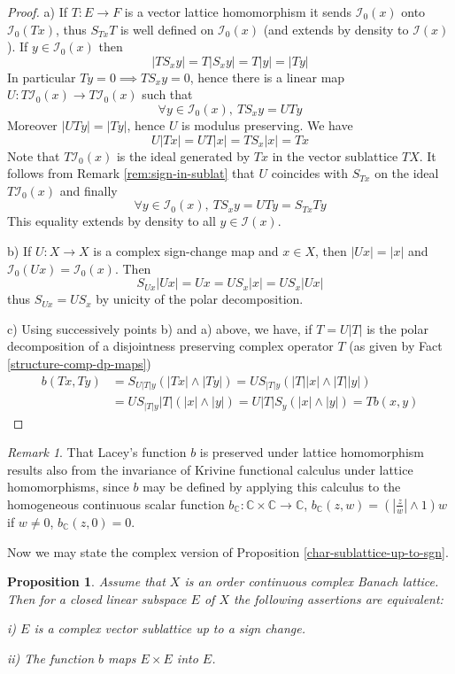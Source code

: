 \documentclass[11pt]{amsart}
\theoremstyle{plain}
\newtheorem{proposition}[theorem]{Proposition}
\theoremstyle{remark}
\newtheorem{remark}[theorem]{Remark}
\newcommand{\comp}{\mathbb C}
\newcommand{\I}{\mathcal I}
\begin{document}
\begin{proof}

a)  If $T:E\to F$ is a vector lattice homomorphism it sends $\mathcal I_0(x)$ onto $\mathcal I_0(Tx)$, thus  $S_{Tx}T$ is well defined on $\mathcal I_0(x)$ (and extends by density to $\I(x)$). If $y\in \mathcal I_0(x)$ then
\[ |TS_xy|= T|S_xy|= T|y|= |Ty|\]
In particular $Ty=0\implies TS_xy=0$, hence there is a linear map $U: T\mathcal I_0(x)\to T\mathcal I_0(x)$ such that
\[\forall y\in  \mathcal I_0(x),\ TS_xy=UTy \]
Moreover $|UTy|=|Ty|$, hence $U$ is modulus preserving. We have 
\[U|Tx| = UT|x|=TS_x|x|=Tx\] 
Note that $T\I_0(x)$ is the ideal generated by $Tx$ in the vector sublattice $TX$. 
It follows from Remark \ref{rem:sign-in-sublat} that $U$ coincides with $S_{Tx}$ on the ideal $T\I_0(x)$ and finally
\[ \forall y\in \mathcal I_0(x),\ TS_xy=UTy=S_{Tx}Ty \]
This equality extends by density to all $y\in \mathcal I(x)$.
\medskip
 
 b) If $U: X\to X$ is a complex sign-change map and $x\in X$, then $|Ux|=|x|$ and $\I_0(Ux)=\I_0(x)$. 
Then
\[ S_{Ux}|Ux|=Ux= US_x|x|= US_x|Ux| \]
thus $S_{Ux}=US_x$ by unicity of the polar decomposition.
\medskip
  
 c)  Using successively points b) and a) above,  we have, if $T=U|T|$ is the polar decomposition of a disjointness preserving complex operator $T$ (as given by Fact \ref{structure-comp-dp-maps}) 
 \begin{align*}
 b(Tx,Ty)&=S_{U|T|y}(|Tx|\wedge |Ty|)=US_{|T|y}(|T||x|\wedge |T||y|)\\
 &=US_{|T|y}|T|(|x|\wedge |y|)= U|T|S_y(|x|\wedge |y|)=Tb(x,y)
\end{align*}
\vskip-12pt
\end{proof}

\begin{remark}
That Lacey's function $b$ is preserved under lattice homomorphism results also from the invariance of Krivine functional calculus under lattice homomorphisms, since $b$ may be defined by applying this calculus  to the homogeneous continuous scalar function $b_\comp:\comp \times\comp \to\comp $, $b_\comp(z,w)= (\left|\frac zw\right| \wedge 1)w $ if $w\ne 0$, $b_\comp(z,0)=0$.
\end{remark}

Now we may state the complex version of Proposition \ref{char-sublattice-up-to-sgn}.

\begin{proposition}\label{char-comp-sublattice-up-to-sgn}
Assume that $X$ is an order continuous complex Banach lattice. Then for a closed linear subspace $E$ of $X$ the following assertions are equivalent:

i) $E$ is a complex vector sublattice up to a sign change.

ii) The function  $b$ maps $E\times E$ into $E$.
\end{proposition}
\end{document}
